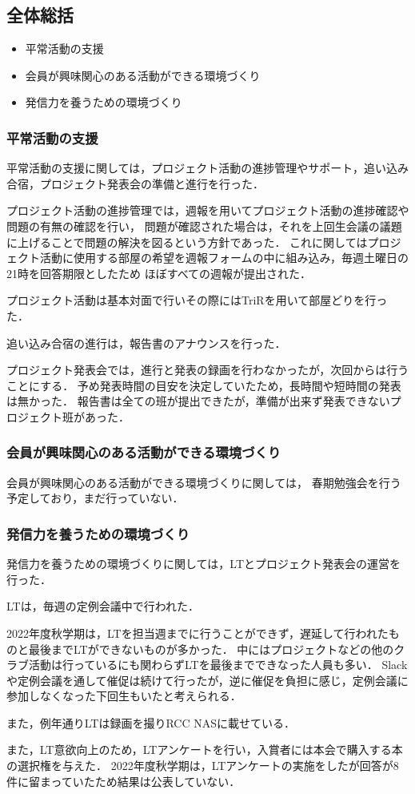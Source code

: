 \subsection*{全体総括}


\begin{itemize}
  \item 平常活動の支援
  \item 会員が興味関心のある活動ができる環境づくり
  \item 発信力を養うための環境づくり
\end{itemize}

\subsubsection*{平常活動の支援}
平常活動の支援に関しては，プロジェクト活動の進捗管理やサポート，追い込み合宿，プロジェクト発表会の準備と進行を行った．

プロジェクト活動の進捗管理では，週報を用いてプロジェクト活動の進捗確認や問題の有無の確認を行い，
問題が確認された場合は，それを上回生会議の議題に上げることで問題の解決を図るという方針であった．
これに関してはプロジェクト活動に使用する部屋の希望を週報フォームの中に組み込み，毎週土曜日の21時を回答期限としたため
ほぼすべての週報が提出された．

プロジェクト活動は基本対面で行いその際にはTriRを用いて部屋どりを行った．

追い込み合宿の進行は，報告書のアナウンスを行った．

プロジェクト発表会では，進行と発表の録画を行わなかったが，次回からは行うことにする．
予め発表時間の目安を決定していたため，長時間や短時間の発表は無かった．
報告書は全ての班が提出できたが，準備が出来ず発表できないプロジェクト班があった．

\subsubsection*{会員が興味関心のある活動ができる環境づくり}
会員が興味関心のある活動ができる環境づくりに関しては，
春期勉強会を行う予定しており，まだ行っていない．

\subsubsection*{発信力を養うための環境づくり}
発信力を養うための環境づくりに関しては，LTとプロジェクト発表会の運営を行った．

LTは，毎週の定例会議中で行われた．

2022年度秋学期は，LTを担当週までに行うことができず，遅延して行われたものと最後までLTができないものが多かった．
中にはプロジェクトなどの他のクラブ活動は行っているにも関わらずLTを最後までできなった人員も多い．
Slackや定例会議を通して催促は続けて行ったが，逆に催促を負担に感じ，定例会議に参加しなくなった下回生もいたと考えられる．

また，例年通りLTは録画を撮りRCC NASに載せている．

また，LT意欲向上のため，LTアンケートを行い，入賞者には本会で購入する本の選択権を与えた．
2022年度秋学期は，LTアンケートの実施をしたが回答が8件に留まっていたため結果は公表していない．
